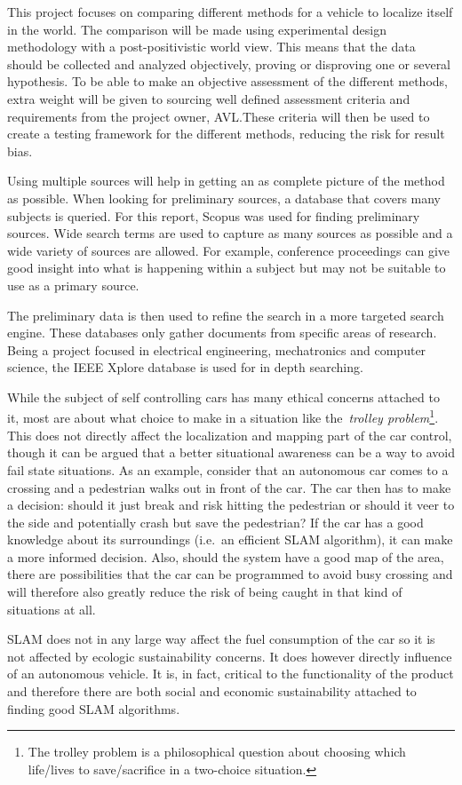This project focuses on comparing different methods for a vehicle to localize
itself in the world. The comparison will be made using experimental design
methodology with a post-positivistic world view. This means that the data should
be collected and analyzed objectively, proving or disproving one or several
hypothesis\cite{creswell}. To be able to make an objective assessment of the different methods,
extra weight will be given to sourcing well defined assessment criteria and
requirements from the project owner, AVL.\@ These criteria will then be used to
create a testing framework for the different methods, reducing the risk for
result bias.

Using multiple sources will help in getting an as complete picture of the method
as possible. When looking for preliminary sources, a database that covers many
subjects is queried. For this report, Scopus was used for finding preliminary
sources. Wide search terms are used to capture as many sources as possible and a
wide variety of sources are allowed. For example, conference proceedings can
give good insight into what is happening within a subject but may not be
suitable to use as a primary source. 

The preliminary data is then used to refine the search in a more targeted search
engine. These databases only gather documents from specific areas of research.
Being a project focused in electrical engineering, mechatronics and computer
science, the IEEE Xplore database is used for in depth searching.  

While the subject of self controlling cars has many ethical concerns attached to
it, most are about what choice to make in a situation like the~\textit{trolley
problem}\footnote{The
trolley problem is a philosophical question about choosing which life/lives to
save/sacrifice in a two-choice situation.}. This does not directly
affect the localization and mapping part of the car control, though it can be
argued that a better situational awareness can be a way to avoid fail state
situations. 
As an example, consider that an autonomous car comes to a crossing and a 
pedestrian walks out in front of the car. The car then has to make a decision:
should it just break and risk hitting the pedestrian or should it veer to the side
and potentially crash but save the pedestrian? If the car has a good knowledge
about its surroundings (i.e.\ an efficient SLAM algorithm), it can make a more 
informed decision. Also, should the system have a good map of the area, there
are possibilities that the car can be programmed to avoid busy crossing and 
will therefore also greatly reduce the risk of being caught in that kind of 
situations at all.

SLAM does not in any large way affect the fuel consumption of the car so it is
not affected by ecologic sustainability concerns. It does however directly
influence of an autonomous vehicle. It is, in fact, critical to the
functionality of the product and therefore there are both social and economic
sustainability attached to finding good SLAM algorithms. 
